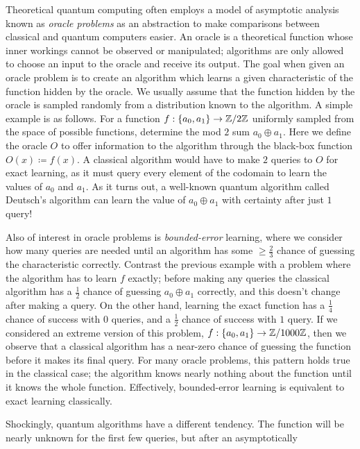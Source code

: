 \documentclass[12pt,twoside]{reedthesis}
\theoremstyle{plain}   %
\theoremstyle{definition}
\theoremstyle{remark}
\numberwithin{equation}{section}
\begin{document}
  Theoretical quantum computing often employs a model %
  of asymptotic analysis known as \emph{oracle problems} as an abstraction to make comparisons between classical and quantum computers easier.
  An oracle is a theoretical function whose inner workings cannot be observed or manipulated; algorithms are only allowed to choose an input to the oracle and receive its output.
  The goal when given an oracle problem is to create an algorithm which learns a given characteristic of the function hidden by the oracle.
  We usually assume that the function hidden by the oracle is sampled randomly from a distribution known to the algorithm.
  A simple example is as follows. For a function $f: \{a_0, a_1 \} \to \mathbb{Z} / 2\mathbb{Z}$ uniformly sampled from the space of possible functions, determine the mod $2$ sum $a_0 \oplus a_1$.
  Here we define the oracle $O$ to offer information to the algorithm through the black-box function $O(x) \coloneq f(x)$.
  A classical algorithm would have to make $2$ queries to $O$ for exact learning, as it must query every element of the codomain to learn the values of $a_0$ and $a_1$.
  As it turns out, a well-known quantum algorithm called Deutsch's algorithm can learn the value of $a_0 \oplus a_1$ with certainty after just $1$ query! \par
  Also of interest in oracle problems is \emph{bounded-error} learning, where we consider how many queries are needed until an algorithm has some $\geq \frac{2}{3}$ chance of guessing the characteristic correctly.
  Contrast the previous example with a problem where the algorithm has to learn $f$ exactly; before making any queries the classical algorithm has a $\frac{1}{2}$ chance of guessing $a_0 \oplus a_1$ correctly,
  and this doesn't change after making a query. On the other hand, learning the exact function has a $\frac{1}{4}$ chance of success with $0$ queries, and a $\frac{1}{2}$ chance of success with $1$ query.
  If we considered an extreme version of this problem, $f: \{a_0, a_1 \} \to \mathbb{Z} / 1000\mathbb{Z}$, then we observe that a classical algorithm has a near-zero chance of guessing the function before it makes its final query.
  For many oracle problems, this pattern holds true in the classical case; the algorithm knows nearly nothing about the function until it knows the whole function.
  Effectively, bounded-error learning is equivalent to exact learning classically. \par
  Shockingly, quantum algorithms have a different tendency.
  The function will be nearly unknown for the first few queries, but after an asymptotically %
\end{document}
